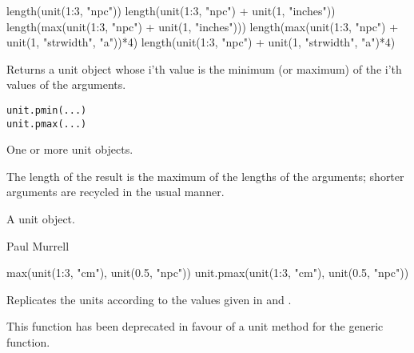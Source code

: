 %
\begin{Examples}
\begin{ExampleCode}
length(unit(1:3, "npc"))
length(unit(1:3, "npc") + unit(1, "inches"))
length(max(unit(1:3, "npc") + unit(1, "inches")))
length(max(unit(1:3, "npc") + unit(1, "strwidth", "a"))*4)
length(unit(1:3, "npc") + unit(1, "strwidth", "a")*4)
\end{ExampleCode}
\end{Examples}
%
\begin{Description}\relax
Returns a unit object whose i'th value is the minimum (or maximum)
of the i'th values of the arguments.  
\end{Description}
%
\begin{Usage}
\begin{verbatim}
unit.pmin(...)
unit.pmax(...)
\end{verbatim}
\end{Usage}
%
\begin{Arguments}
\begin{ldescription}
\item[\code{...}]  One or more unit objects. 
\end{ldescription}
\end{Arguments}
%
\begin{Details}\relax
The length of the result is the maximum of the lengths of the
arguments;  shorter arguments are recycled in the usual manner.
\end{Details}
%
\begin{Value}
A unit object.
\end{Value}
%
\begin{Author}\relax
 Paul Murrell 
\end{Author}
%
\begin{Examples}
\begin{ExampleCode}
max(unit(1:3, "cm"), unit(0.5, "npc"))
unit.pmax(unit(1:3, "cm"), unit(0.5, "npc"))
\end{ExampleCode}
\end{Examples}
%
\begin{Description}\relax
Replicates the units according to the values given in  and
.

This function has been deprecated in favour of a unit method for
the generic  function.
\end{Description}
